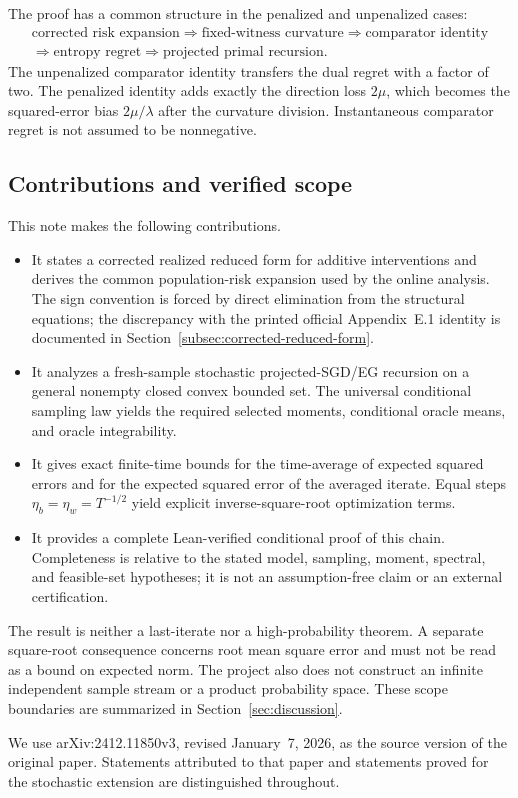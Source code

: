 The proof has a common structure in the penalized and unpenalized cases:
\[
  \begin{gathered}
    \text{corrected risk expansion}
    \Longrightarrow \text{fixed-witness curvature}
    \Longrightarrow \text{comparator identity}\\
    \Longrightarrow \text{entropy regret}
    \Longrightarrow \text{projected primal recursion}.
  \end{gathered}
\]
The unpenalized comparator identity transfers the dual regret with a factor of
two.  The penalized identity adds exactly the direction loss $2\mu$, which
becomes the squared-error bias $2\mu/\lambda$ after the curvature division.
Instantaneous comparator regret is not assumed to be nonnegative.

\subsection{Contributions and verified scope}

This note makes the following contributions.
\begin{itemize}[leftmargin=*]
  \item It states a corrected realized reduced form for additive interventions and
        derives the common population-risk expansion used by the online
        analysis.  The sign convention is forced by direct elimination from
        the structural equations; the discrepancy with the printed official
        Appendix~E.1 identity is documented in
        Section~\ref{subsec:corrected-reduced-form}.
  \item It analyzes a fresh-sample stochastic projected-SGD/EG recursion on a
        general nonempty closed convex bounded set.  The universal conditional
        sampling law yields the required selected moments, conditional oracle
        means, and oracle integrability.
  \item It gives exact finite-time bounds for the time-average of expected
        squared errors and for the expected squared error of the averaged
        iterate.  Equal steps $\eta_b=\eta_w=T^{-1/2}$ yield explicit
        inverse-square-root optimization terms.
  \item It provides a complete Lean-verified conditional proof of this chain.
        Completeness is relative to the stated model, sampling, moment,
        spectral, and feasible-set hypotheses; it is not an assumption-free
        claim or an external certification.
\end{itemize}

The result is neither a last-iterate nor a high-probability theorem.  A
separate square-root consequence concerns root mean square error and must not
be read as a bound on expected norm.  The project also does not construct an
infinite independent sample stream or a product probability space.  These
scope boundaries are summarized in Section~\ref{sec:discussion}.

We use arXiv:2412.11850v3, revised January~7, 2026, as the source version of
the original paper.  Statements attributed to that paper and statements
proved for the stochastic extension are distinguished throughout.
